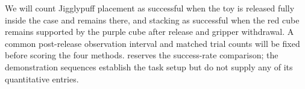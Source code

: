 We will count Jigglypuff placement as successful when the toy is released
fully inside the case and remains there, and stacking as successful when the
red cube remains supported by the purple cube after release and gripper
withdrawal. A common post-release observation interval and matched trial
counts will be fixed before scoring the four methods. 
reserves the success-rate comparison; the demonstration sequences establish
the task setup but do not supply any of its quantitative entries.
